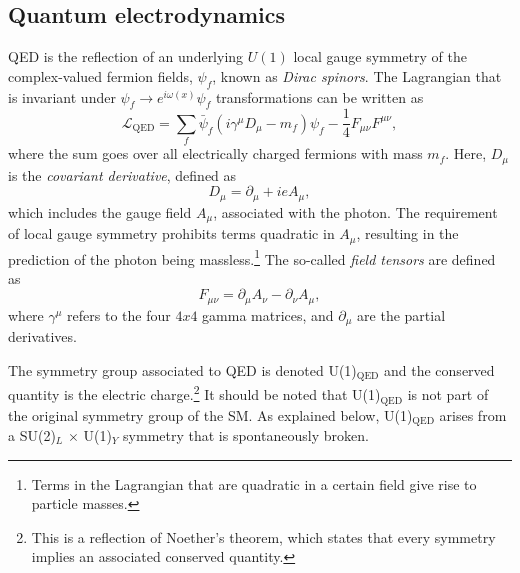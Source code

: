\subsection{Quantum electrodynamics}
QED is the reflection of an underlying $U(1)$ local gauge symmetry of the complex-valued fermion fields, $\psi_f$, known as \emph{Dirac spinors}.
The Lagrangian that is invariant under $\psi_f \rightarrow e^{i \omega(x)} \psi_f$ transformations can be written as
\begin{equation}
  \mathcal{L}_{\text{QED}} = \sum_f \bar{\psi}_f(i\gamma^\mu D_\mu - m_f)\psi_f - \frac{1}{4}F_{\mu\nu}F^{\mu\nu},
  \label{eq:Lagrangianqed}
\end{equation}
where the sum goes over all electrically charged fermions with mass $m_f$.
Here, $D_\mu$ is the \emph{covariant derivative}, defined as
\begin{equation}
  D_\mu = \partial_\mu + ieA_\mu,
\end{equation}
which includes the gauge field $A_\mu$, associated with the photon. The requirement of local gauge symmetry prohibits terms quadratic in $A_\mu$, resulting in the prediction of the photon being massless.\footnote{Terms in the Lagrangian that are quadratic in a certain field give rise to particle masses.}
The so-called \emph{field tensors} are defined as
\begin{equation}
  F_{\mu\nu} = \partial_\mu A_\nu - \partial_\nu A_\mu,
\end{equation}
where $\gamma^\mu$ refers to the four $4x4$ gamma matrices, and $\partial_\mu$ are the partial derivatives.

The symmetry group associated to QED is denoted U(1)$_{\text{QED}}$ and the conserved quantity is the electric charge.\footnote{This is a reflection of Noether's theorem, which states that every symmetry implies an associated conserved quantity.}
It should be noted that U(1)$_{\text{QED}}$ is not part of the original symmetry group of the SM. As explained below, U(1)$_{\text{QED}}$ arises from a SU(2)$_L$ $\times$ U(1)$_Y$ symmetry that is spontaneously broken.


